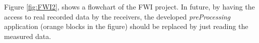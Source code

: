 \documentclass[10pt,a4paper]{article}
\newcommand{\commentstmtwo}[1]{\textcolor{purple}{\textbf{STM:\ #1}}}
\begin{document}
Figure \ref{fig:FWI2}, shows a flowchart of the FWI project. In future, by having the access to real recorded data by the receivers, the developed \textit{preProcessing} application (orange blocks in the figure) should be replaced by just reading the measured data.

\end{document}
